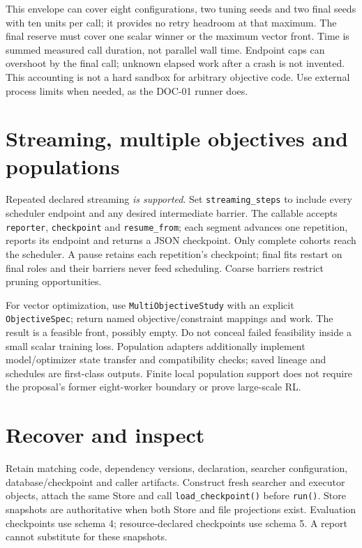 This envelope can cover eight configurations, two tuning seeds and two final
seeds with ten units per call; it provides no retry headroom at that maximum.
The final reserve must cover one scalar winner or the maximum vector front.
Time is summed measured call duration, not parallel wall time. Endpoint caps
can overshoot by the final call; unknown elapsed work after a crash is not
invented. This accounting is not a hard sandbox for arbitrary objective code.
Use external process limits when needed, as the DOC-01 runner does.

\section{Streaming, multiple objectives and populations}

Repeated declared streaming \emph{is supported}. Set
\texttt{streaming\_steps} to include every scheduler endpoint and any desired
intermediate barrier. The callable accepts \texttt{reporter},
\texttt{checkpoint} and \texttt{resume\_from}; each segment advances one
repetition, reports its endpoint and returns a JSON checkpoint. Only complete
cohorts reach the scheduler. A pause retains each repetition's checkpoint;
final fits restart on final roles and their barriers never feed scheduling.
Coarse barriers restrict pruning opportunities.

For vector optimization, use \texttt{MultiObjectiveStudy} with an explicit
\texttt{ObjectiveSpec}; return named objective/constraint mappings and work.
The result is a feasible front, possibly empty. Do not conceal failed feasibility
inside a small scalar training loss. Population adapters additionally implement
model/optimizer state transfer and compatibility checks; saved lineage and
schedules are first-class outputs. Finite local population support does not
require the proposal's former eight-worker boundary or prove large-scale RL.

\section{Recover and inspect}

Retain matching code, dependency versions, declaration, searcher configuration,
database/checkpoint and caller artifacts. Construct fresh searcher and executor
objects, attach the same Store and call \texttt{load\_checkpoint()} before
\texttt{run()}. Store snapshots are authoritative when both Store and file
projections exist. Evaluation checkpoints use schema 4; resource-declared
checkpoints use schema 5. A report cannot substitute for these snapshots.

